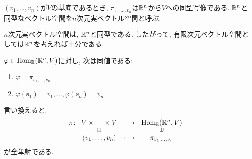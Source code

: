 \begin{remark}
  $(v_1,\ldots,v_n)$が$V$の基底であるとき,
  $\pi_{v_1,\ldots,v_n}$は$\mathbb{R}^n$から$V$への同型写像である.
  $\mathbb{R}^n$と同型なベクトル空間を$n$次元実ベクトル空間と呼ぶ.
\end{remark}

\begin{remark}
  $n$次元実ベクトル空間は,
  $\mathbb{R}^n$と同型である.
  したがって,
  有限次元ベクトル空間としては$\mathbb{R}^n$を考えれば十分である.
\end{remark}
\begin{remark}
  $\varphi \in \operatorname{Hom}_{\mathbb{R}}(\mathbb{R}^n,V)$に対し,
  次は同値である:
  \begin{enumerate}
  \item $\varphi=\pi_{v_1,\ldots,v_n}$
  \item $\varphi(\ee_1)=v_1,\ldots,\varphi(\ee_n)=v_n$
  \end{enumerate}
  言い換えると,
  \begin{align*}
    \pi\colon
    \Shazo{V\times\cdots \times V}{\Hom_\RR(\RR^n,V)}
          {(v_1,\ldots,v_n)}{\pi_{v_1,\ldots,v_n}}
  \end{align*}
  が全単射である.
\end{remark}

